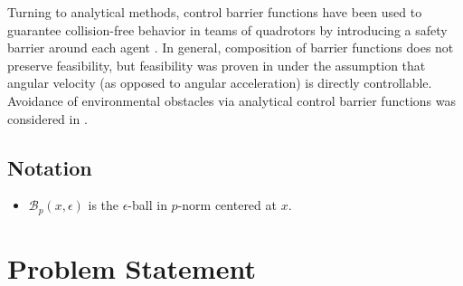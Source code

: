 \documentclass[conference]{IEEEtran}
\begin{document}
Turning to analytical methods, control barrier functions have been used to guarantee collision-free behavior in teams of quadrotors by introducing a safety barrier around each agent \cite{Wang2017a}. In general, composition of barrier functions does not preserve feasibility, but feasibility was proven in \cite{Wang2017} under the assumption that angular velocity (as opposed to angular acceleration) is directly controllable. Avoidance of environmental obstacles via analytical control barrier functions was considered in \cite{Wu2016}.

\subsection{Notation}

\begin{itemize}
  \item $\mathcal B_p(x,\epsilon)$ is the $\epsilon$-ball in $p$-norm centered at $x$.
\end{itemize}

\section{Problem Statement}
\end{document}
